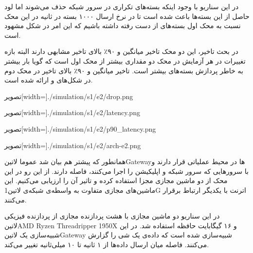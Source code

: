 در این سناریو با وجود اینکه بسته‌های تکراری در سرور شبکه حذف می‌شوند اما لود حاصل از این بسته‌ها باعث شده است تا در نرخ ارسال ۱۰۰۰ بسته در ثانیه
در این محک نسبت به محک اول بسته‌های از دست رفته داشته باشیم که این امر در شکل 
مشهود است.

در بحث تاخیر، این دو محک تاخیر میانگین و ۹۰٪ بالای تاخیر مشابهی دارند البته بازه تغییرات در هر آزمایش در محک دو مقداری بیشتر از محک اول است
که گویا بار بیشتر به خاطر پردازش بسته‌های بیشتر است. تاخیر میانگین و ۹۰٪ بالای تاخیر در محک دوم در شکل‌های 
و 
ارائه شده است.

‌تصویر[width=\textwidth]{./simulation/s1/e2/drop.png}

‌تصویر[width=\textwidth]{./simulation/s1/e2/latency.png}

‌تصویر[width=\textwidth]{./simulation/s1/e2/p90_latency.png}

‌تصویر[width=\textwidth]{./simulation/s1/e2/arch-e2.png}



همانطور که پیشتر هم بیان شد عموما ‌لاتین{Gateway}ها در محیط عملیاتی قرار دارند و با سرورهایی که سرور شبکه
و اپلیکیشن را اجرا می‌کنند، فاصله دارند. از این رو در این محک از دو ماشین مجازی مجزا استفاده کرده و تاثیر آن را ارزیابی می‌کنیم.
این ماشین‌های مجازی متفاوت به واسطه‌ی شبکه‌ی ‌لاتین{1G} اترنت با یکدیگر ارتباط برقرار می‌کنند.

در این سناریو دو ماشین مجازی با هشت پردازنده مجازی از پردازنده فیزیکی
‌لاتین{AMD Ryzen Threadripper 1950X}
و ۱۶ گیگابایت حافظه استفاده شد.
در این شبیه‌سازی یک ‌لاتین{Gateway} شبیه‌سازی شده است که داده‌ی یک شی را گزارش می‌کنند. فاصله میان ارسال داده‌ها از ۱ ثانیه تا ۱۰ میلی‌ثانیه تغییر می‌کند.

